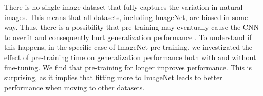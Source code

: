 There is no single image dataset that fully captures the variation in natural images. This means that all datasets, including ImageNet, are biased in some way. Thus, there is a possibility that pre-training may eventually cause the CNN to overfit and consequently hurt generalization performance \cite{torralba2011unbiased}. To understand if this happens, in the specific case of ImageNet pre-training, we investigated the effect of pre-training time on generalization performance both with and without fine-tuning. We find that pre-training for longer improves performance. This is surprising, as it implies that fitting more to ImageNet leads to better performance when moving to other datasets. %


